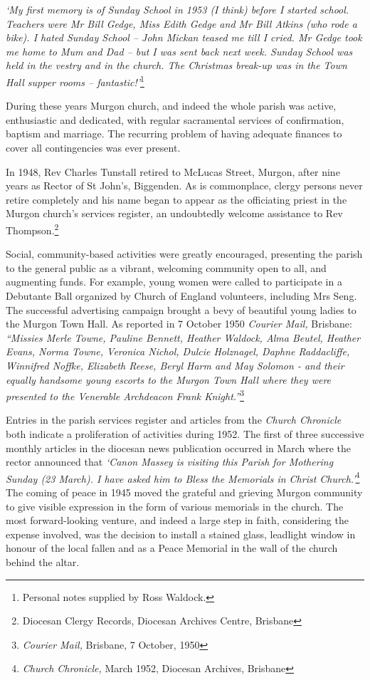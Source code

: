 \emph{`My first memory is of Sunday School in 1953 (I think) before I started school. Teachers were Mr Bill Gedge, Miss Edith Gedge and Mr Bill Atkins (who rode a bike). I hated Sunday School -- John Mickan teased me till I cried. Mr Gedge took me home to Mum and Dad -- but I was sent back next week. Sunday School was held in the vestry and in the church. The Christmas break-up was in the Town Hall supper rooms -- fantastic!'}\footnote{Personal notes supplied by Ross Waldock.}


\smallskip


During these years Murgon church, and indeed the whole parish was active, enthusiastic and dedicated, with regular sacramental services of confirmation, baptism and marriage. The recurring problem of having adequate finances to cover all contingencies was ever present.



In 1948, Rev Charles Tunstall retired to McLucas Street, Murgon, after nine years as Rector of St John's, Biggenden. As is commonplace, clergy persons never retire completely and his name began to appear as the officiating priest in the Murgon church's services register, an undoubtedly welcome assistance to Rev Thompson.\footnote{Diocesan Clergy Records, Diocesan Archives Centre, Brisbane}


Social, community-based activities were greatly encouraged, presenting the parish to the general public as a vibrant, welcoming community open to all, and augmenting funds. For example, young women were called to participate in a Debutante Ball organized by Church of England volunteers, including Mrs Seng. The successful advertising campaign brought a bevy of beautiful young ladies to the Murgon Town Hall. As reported in 7 October 1950 \emph{Courier Mail,} Brisbane: \emph{``Missies Merle Towne, Pauline Bennett, Heather Waldock, Alma Beutel, Heather Evans, Norma Towne, Veronica Nichol, Dulcie Holznagel, Daphne Raddacliffe, Winnifred Noffke, Elizabeth Reese, Beryl Harm and May Solomon - and their equally handsome young escorts to the Murgon Town Hall where they were presented to the Venerable Archdeacon Frank Knight.''}\footnote{\emph{Courier Mail,} Brisbane, 7 October, 1950}


Entries in the parish services register and articles from the \emph{Church Chronicle} both indicate a proliferation of activities during 1952. The first of three successive monthly articles in the diocesan news publication occurred in March where the rector announced that \emph{`Canon Massey is visiting this Parish for Mothering Sunday (23 March). I have asked him to Bless the Memorials in Christ Church.'}\footnote{\emph{Church Chronicle,} March 1952, Diocesan Archives, Brisbane} The coming of peace in 1945 moved the grateful and grieving Murgon community to give visible expression in the form of various memorials in the church. The most forward-looking venture, and indeed a large step in faith, considering the expense involved, was the decision to install a stained glass, leadlight window in honour of the local fallen and as a Peace Memorial in the wall of the church behind the altar.


